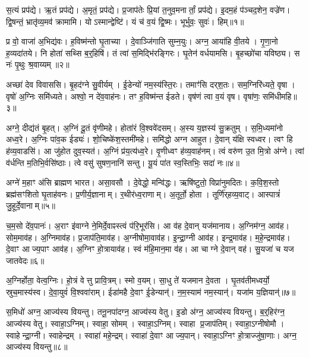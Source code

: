 स॒त्यं प्रप॑द्ये।
ऋ॒तं प्रप॑द्ये।
अ॒मृतं॒ प्रप॑द्ये।
प्र॒जाप॑तेः प्रि॒यां त॒नुव॒मनार्तां॒ प्रप॑द्ये।
इ॒दम॒हं प॑ञ्चद॒शेन॒ वज्रे॑ण।
द्वि॒षन्तं॒ भ्रातृ॑व्य॒मव॑ क्रामामि।
योऽस्मान्द्वेष्टि॑।
यं च॑ व॒यं द्वि॒ष्मः।
भूर्भुवः॒ सुवः॑।
हिम्॥१॥\anuvakamend[स॒त्यं दश॑]

प्र वो॒ वाजा॑ अ॒भिद्य॑वः।
ह॒विष्म॑न्तो घृ॒ताच्या।
दे॒वाञ्जि॑गाति सुम्न॒युः।
अग्न॒ आया॑हि वी॒तये।
गृ॒णा॒नो ह॒व्यदा॑तये।
नि होता॑ सथ्सि ब॒र्॒हिषि॑।
तं त्वा॑ स॒मिद्भि॑रङ्गिरः।
घृ॒तेन॑ वर्धयामसि।
बृ॒हच्छो॑चा यविष्ठ्य।
स नः॑ पृ॒थुः श्र॒वाय्यम्॥२॥

अच्छा॑ देव विवाससि।
बृ॒हद॑ग्ने सु॒वीर्यम्।
ई॒डेन्यो॑ नम॒स्य॑स्ति॒रः।
तमाꣳ॑सि दर्‌\mbox{}श॒तः।
सम॒ग्निरि॑ध्यते॒ वृषा।
वृषो॑ अ॒ग्निः समि॑ध्यते।
अश्वो॒ न दे॑व॒वाह॑नः।
तꣳ ह॒विष्म॑न्त ईडते।
वृष॑णं त्वा व॒यं वृष\sn{}।
वृषा॑णः॒ समि॑धीमहि॥३॥

अग्ने॒ दीद्य॑तं बृ॒हत्।
अ॒ग्निं दू॒तं वृ॑णीमहे।
होता॑रं वि॒श्ववे॑दसम्।
अ॒स्य य॒ज्ञस्य॑ सु॒क्रतुम्।
स॒मि॒ध्यमा॑नो अध्व॒रे।
अ॒ग्निः पा॑व॒क ईड्यः॑।
शो॒चिष्के॑श॒स्तमी॑महे।
समि॑द्धो अग्न आहुत।
दे॒वान् य॑क्षि स्वध्वर।
त्वꣳ हि ह॑व्य॒वाडसि॑।
आ जु॑होत दुव॒स्यत॑।
अ॒ग्निं प्र॑य॒त्य॑ध्व॒रे।
वृ॒णीध्वꣳ ह॑व्य॒वाह॑नम्।
त्वं वरु॑ण उ॒त मि॒त्रो अ॑ग्ने।
त्वां व॑र्धन्ति म॒तिभि॒र्वसि॑ष्ठाः।
त्वे वसु॑ सुषण॒नानि॑ सन्तु।
यू॒यं पा॑त स्व॒स्तिभिः॒ सदा॑ नः॥४॥\anuvakamend[श्र॒वाय्य॑मिधीम॒ह्यसि॑ स॒प्त च॑]

अग्ने॑ म॒हाꣳ अ॑सि ब्राह्मण भारत।
असा॒वसौ।
दे॒वेद्धो॒ मन्वि॑द्धः।
ऋषि॑ष्टुतो॒ विप्रा॑नुमदितः।
क॒वि॒श॒स्तो ब्रह्म॑सꣳशितो घृ॒ताह॑वनः।
प्र॒णीर्य॒ज्ञानाम्।
र॒थीर॑ध्व॒राणाम्।
अ॒तूर्तो॒ होता।
तूर्णि॑र्‌\mbox{}हव्य॒वाट्।
आस्पात्रं॑ जु॒हूर्दे॒वानाम्॥५॥

च॒म॒सो दे॑व॒पानः॑।
अ॒राꣳ इ॑वाग्ने ने॒मिर्दे॒वाꣴस्त्वं प॑रि॒भूर॑सि।
आ व॑ह दे॒वान् यज॑मानाय।
अ॒ग्निम॑ग्न॒ आव॑ह।
सोम॒माव॑ह।
अ॒ग्निमाव॑ह।
प्र॒जाप॑ति॒माव॑ह।
अ॒ग्नीषोमा॒वाव॑ह।
इ॒न्द्रा॒ग्नी आव॑ह।
इन्द्र॒माव॑ह।
म॒हे॒न्द्रमाव॑ह।
दे॒वाꣳ आज्य॒पाꣳ आव॑ह।
अ॒ग्निꣳ हो॒त्रायाव॑ह।
स्वं म॑हि॒मान॒मा व॑ह।
आ चाग्ने दे॒वान् वह॑।
सु॒यजा॑ च यज जातवेदः॥६॥\anuvakamend[दे॒वाना॒मिन्द्र॒मा व॑ह॒ षट् च॑]

अ॒ग्निर्\mbox{}होता॒ वेत्व॒ग्निः।
हो॒त्रं वेत्तु प्रावि॒त्रम्।
स्मो व॒यम्।
सा॒धु ते॑ यजमान दे॒वता।
घृ॒तव॑तीमध्वर्यो॒ स्रुच॒मास्य॑स्व।
दे॒वा॒युवं॑ वि॒श्ववा॑राम्।
ईडा॑महै दे॒वाꣳ ई॒डेन्यान्॑।
न॒म॒स्याम॑ नम॒स्यान्॑।
यजा॑म य॒ज्ञियान्॑॥७॥\anuvakamend[अ॒ग्निर्‌\mbox{}होता॒ नव॑]

स॒मिधो॑ अग्न॒ आज्य॑स्य वियन्तु।
तनू॒नपा॑दग्न॒ आज्य॑स्य वेतु।
इ॒डो अ॑ग्न॒ आज्य॑स्य वियन्तु।
ब॒र्॒हिर॑ग्न॒ आज्य॑स्य वेतु।
स्वाहा॒\-ऽग्निम्।
स्वाहा॒ सोमम्।
स्वाहा॒\-ऽग्निम्।
स्वाहा प्र॒जाप॑तिम्।
स्वाहा॒\-ऽग्नीषोमौ।
स्वाहेन्द्रा॒ग्नी।
स्वाहेन्द्रम्।
स्वाहा॑ महे॒न्द्रम्।
स्वाहा॑ दे॒वाꣳ आज्य॒पान्।
स्वाहा॒\-ऽग्निꣳ हो॒त्राज्जु॑षा॒णाः।
अग्न॒ आज्य॑स्य वियन्तु॥८॥\anuvakamend[इ॒न्द्रा॒ग्नी पञ्च॑ च]

